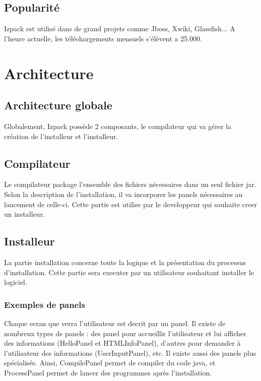 \subsection{Popularité}
Izpack est utilisé dans de grand projets comme Jboss, Xwiki, Glassfish... A l'heure actuelle, les téléchargements mensuels s'élèvent a 25.000.


\section{Architecture}
\subsection{Architecture globale}
Globalement, Izpack possède 2 composants, le compilateur qui va gérer la création de l'installeur et l'installeur.
\subsection{Compilateur}
Le compilateur package l'ensemble des fichiers nécessaires dans un seul fichier jar. Selon la description de l'installation, il va incorporer les panels nécessaires au lancement de celle-ci. Cette partie est utilise par le developpeur qui souhaite creer un installeur.
\subsection{Installeur}
La partie installation concerne toute la logique et la présentation du processus d'installation. Cette partie sera executer par un utilisateur souhaitant installer le logiciel.
\subsubsection{Exemples de panels}
Chaque ecran que verra l'utilisateur est decrit par un panel.
Il existe de nombreux types de panels : des panel pour accueillir l'utilisateur et lui afficher des informations (HelloPanel et HTMLInfoPanel), d'autres pour demander à l'utilisateur des informations (UserInputPanel), etc.
Il existe aussi des panels plus spécialisés. Ainsi, CompilePanel permet de compiler du code java, et ProcessPanel permet de lancer des programmes après l'installation.


